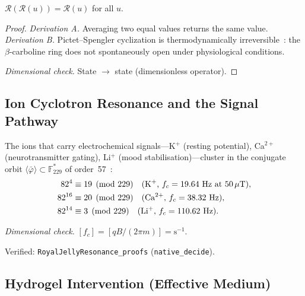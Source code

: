 \begin{theorem}
$\mathcal{R}(\mathcal{R}(u)) = \mathcal{R}(u)$ for all $u$.

\begin{proof}
\emph{Derivation A.} Averaging two equal values returns the same value.
\emph{Derivation B.} Pictet--Spengler cyclization is thermodynamically
irreversible~\cite{stockigt11}: the $\beta$-carboline ring does not
spontaneously open under physiological conditions.

\emph{Dimensional check.} State $\to$ state (dimensionless operator). \checkmark
\qedhere
\end{proof}
\end{theorem}

\subsection{Ion Cyclotron Resonance and the Signal Pathway}

\begin{result}
\label{res:ions}
The ions that carry electrochemical signals---K$^+$ (resting potential),
Ca$^{2+}$ (neurotransmitter gating), Li$^+$ (mood stabilisation)---cluster
in the conjugate orbit $\langle\bar\varphi\rangle \subset \mathbb{F}_{229}^*$
of order~57~\cite{rja}:
\begin{align}
  82^4 &\equiv 19 \pmod{229} \quad\text{(K$^+$, $f_c = 19.64$ Hz at 50\,$\mu$T)}, \\
  82^{16} &\equiv 20 \pmod{229} \quad\text{(Ca$^{2+}$, $f_c = 38.32$ Hz)}, \\
  82^{14} &\equiv 3 \pmod{229} \quad\text{(Li$^+$, $f_c = 110.62$ Hz)}.
\end{align}

\emph{Dimensional check.} $[f_c] = [qB/(2\pi m)] = \mathrm{s^{-1}}$. \checkmark

Verified: \texttt{RoyalJellyResonance\_proofs} (\texttt{native\_decide}).
\end{result}

\subsection{Hydrogel Intervention (Effective Medium)}

